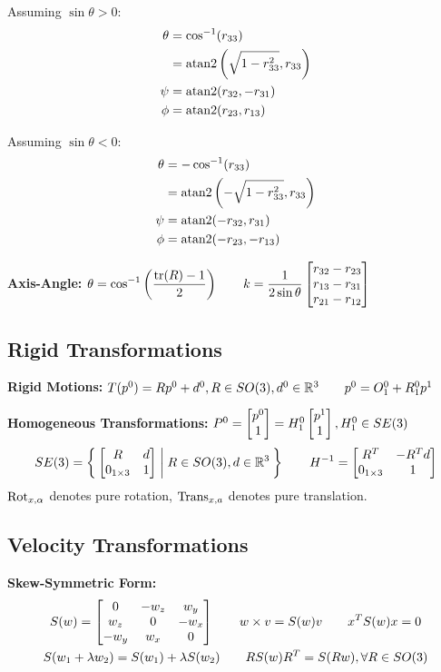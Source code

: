 \documentclass[twocolumn, 8pt]{extarticle}
\begin{document}
\begin{minipage}{0.5\linewidth}
    Assuming \(\sin\theta > 0\):
    \begin{align*}
        \theta &= \cos^{-1}(r_{33}) \\
               &= \operatorname{atan2}\left(\sqrt{1 - r_{33}^2}, r_{33}\right) \\
        \psi &= \operatorname{atan2}(r_{32}, -r_{31}) \\
        \phi &= \operatorname{atan2}(r_{23}, r_{13})
    \end{align*}
\end{minipage}
\begin{minipage}{0.5\linewidth}
    Assuming \(\sin\theta < 0\):
    \begin{align*}
        \theta &= -\cos^{-1}(r_{33}) \\
               &= \operatorname{atan2}\left(-\sqrt{1 - r_{33}^2}, r_{33}\right) \\
        \psi &= \operatorname{atan2}(-r_{32}, r_{31}) \\
        \phi &= \operatorname{atan2}(-r_{23}, -r_{13})
    \end{align*}
\end{minipage}

\textbf{Axis-Angle:}
\(\displaystyle\theta = \cos^{-1}\left(\frac{\tr(R) - 1}{2}\right) \qquad
k = \frac{1}{2\sin\theta}\cvec{r_{32} - r_{23}}{r_{13} - r_{31}}{r_{21} - r_{12}}\)

\subsection{Rigid Transformations}

\textbf{Rigid Motions:} \(T(p^0) = Rp^0 + d^0, R \in SO(3), d^0 \in \mathbb{R}^3 \qquad p^0 = O_1^0 + R_1^0p^1\)

\textbf{Homogeneous Transformations:} \(P^0 = \cvec{p^0}{1} = H_1^0\cvec{p^1}{1}, H_1^0 \in SE(3)\)
\[SE(3) = \Set{\begin{bmatrix} {R} & {d} \\ {0_{1 \times 3}} & {1} \end{bmatrix} | R \in SO(3), d \in \mathbb{R}^3} \qquad H^{-1} = \begin{bmatrix} {R^T} & {-R^Td} \\ {0_{1 \times 3}} & {1} \end{bmatrix}\]
\(\mathrm{Rot}_{x,\alpha}\) denotes pure rotation, \(\mathrm{Trans}_{x,a}\) denotes pure translation.

\subsection{Velocity Transformations}

\textbf{Skew-Symmetric Form:}
\begin{gather*}
S(w) = \matthree{0}{-w_z}{w_y}{w_z}{0}{-w_x}{-w_y}{w_x}{0} \qquad w \times v = S(w)v \qquad x^TS(w)x = 0 \\
S(w_1 + \lambda w_2) = S(w_1) + \lambda S(w_2) \qquad RS(w)R^T = S(Rw),\forall R \in SO(3)
\end{gather*}
\end{document}
